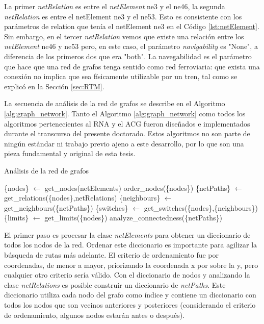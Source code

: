     La primer \textit{netRelation} es entre el \textit{netElement} ne3 y el ne46, la segunda \textit{netRelation} es entre el netElement ne3 y el ne53. Esto es consistente con los parámetros de relation que tenía el netElement ne3 en el Código \ref{lst:netElement}. Sin embargo, en el tercer \textit{netRelation} vemos que existe una relación entre los \textit{netElement} ne46 y ne53 pero, en este caso, el parámetro \textit{navigability} es "None", a diferencia de los primeros dos que era "both". La navegabilidad es el parámetro que hace que una red de grafos tenga sentido como red ferroviaria: que exista una conexión no implica que sea físicamente utilizable por un tren, tal como se explicó en la Sección \ref{sec:RTM}.
    
    La secuencia de análisis de la red de grafos se describe en el Algoritmo \ref{alg:graph_network}. Tanto el Algoritmo \ref{alg:graph_network} como todos los algoritmos pertenecientes al RNA y el ACG fueron diseñados e implementados durante el transcurso del presente doctorado. Estos algoritmos no son parte de ningún estándar ni trabajo previo ajeno a este desarrollo, por lo que son una pieza fundamental y original de esta tesis.    
    
    \begin{algorithm}[H]
    	\caption{Análisis de la red de grafos}
    	\label{alg:graph_network}
    	\begin{algorithmic}
    		\STATE \{nodes\} $\gets$ get\_nodes(netElements)
    		\STATE  order\_nodes(\{nodes\})
    		\STATE \{netPaths\} $\gets$ get\_relations(\{nodes\},netRelations)
    		\STATE \{neighbours\} $\gets$ get\_neighbours(\{netPaths\})
    		\STATE \{switches\} $\gets$ get\_switches(\{nodes\},\{neighbours\})
    		\STATE \{limits\} $\gets$ get\_limits(\{nodes\})
    		\STATE analyze\_connectedness(\{netPaths\})
    	\end{algorithmic}
    \end{algorithm}
    
    El primer paso es procesar la clase \textit{netElements} para obtener un diccionario de todos los nodos de la red. Ordenar este diccionario es importante para agilizar la búsqueda de rutas más adelante. El criterio de ordenamiento fue por coordenadas, de menor a mayor, priorizando la coordenada x por sobre la y, pero cualquier otro criterio sería válido. Con el diccionario de nodos y analizando la clase \textit{netRelations} es posible construir un diccionario de \textit{netPaths}. Este diccionario utiliza cada nodo del grafo como índice y contiene un diccionario con todos los nodos que son vecinos anteriores y posteriores (considerando el criterio de ordenamiento, algunos nodos estarán antes o después).

